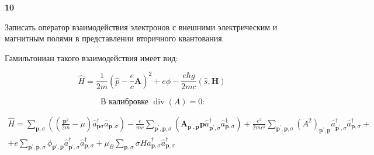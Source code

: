 \documentclass[a4paper,12pt]{article} %
\begin{document}
\begin{task}

\textbf{10}

Записать оператор взаимодействия электронов с внешними электрическим и магнитным полями в представлении вторичного квантования.



Гамильтониан такого взаимодействия имеет вид:



$$
\hat{H}=\frac{1}{2 m}\left(\hat{p}-\frac{e}{c} \boldsymbol{A}\right)^{2}+e \phi-\frac{e \hbar g}{2 m c}(\widehat{s}, \boldsymbol{H})
$$




$$
\text { В калибровке } \operatorname{div}(A)=0:
$$





$$
\begin{array}{c}
	\widehat{H}=\sum_{\boldsymbol{p}, \sigma}\left(\left(\frac{\boldsymbol{p}^{2}}{2 m}-\mu\right) \hat{a}_{\boldsymbol{p} \sigma}^{\dagger} \hat{a}_{\boldsymbol{p}, \sigma}\right)-\frac{e}{m c} \sum_{\boldsymbol{p}^{\prime}, \boldsymbol{p}, \sigma}\left(\boldsymbol{A}_{\boldsymbol{p}^{\prime}, \boldsymbol{p}} \boldsymbol{p} \hat{a}_{\boldsymbol{p}^{\prime}, \sigma}^{\dagger} \hat{a}_{\boldsymbol{p}, \sigma}^{\dagger}\right)
	+
	\frac{e^{2}}{2 m c^{2}} \sum_{\boldsymbol{p}^{\prime}, \boldsymbol{p}, \sigma}
	\left(A^{2}\right)_{\boldsymbol{p}^{\prime}, \boldsymbol{p}} 
	\hat{a}_{\boldsymbol{p}^{\prime}, \sigma}^{\dagger} 
	\hat{a}_{\boldsymbol{p}, \sigma}^{\dagger}
	+\\
	+e \sum_{\boldsymbol{p}^{\prime}, \boldsymbol{p}, \sigma}
	\phi_{\boldsymbol{p}^{\prime}, \boldsymbol{p}} 
	\hat{a}_{\boldsymbol{p}^{\prime}, \sigma}^{\dagger} 
	\hat{a}_{\boldsymbol{p}, \sigma}^{\dagger}
	+
	\mu_{B} \sum_{\boldsymbol{p}, \sigma}
	\sigma 
	H 
	\hat{a}_{\boldsymbol{p}, \sigma}^{\dagger} 
	\hat{a}_{\boldsymbol{p}, \sigma}^{\dagger}
\end{array}
$$





















\end{task}
\end{document}
